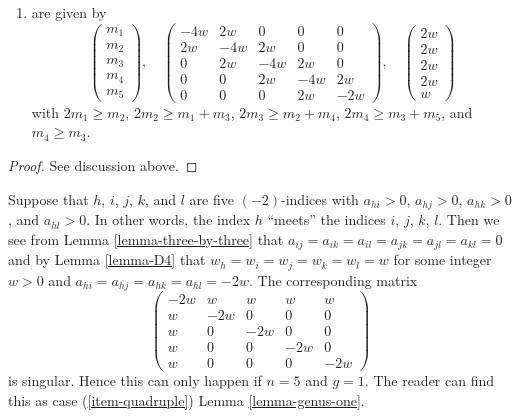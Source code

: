 \begin{lemma}
\begin{enumerate}
$$\begin{matrix}
w \\
w \\
2w
\end{matrix}
\right)
$$
with $2m_1 \geq m_2$, $2m_2 \geq m_1 + m_3$, $2m_3 \geq m_2 + 2m_4$,
$2m_4 \geq m_3 + m_5$, and $2m_5 \geq m_4$, or
\item
\label{item-B5}
are given by
$$
\left(
\begin{matrix}
m_1 \\
m_2 \\
m_3 \\
m_4 \\
m_5
\end{matrix}
\right),
\quad
\left(
\begin{matrix}
-4w & 2w & 0 & 0 & 0 \\
2w & -4w & 2w & 0 & 0 \\
0 & 2w & -4w & 2w & 0 \\
0 & 0 & 2w & -4w & 2w \\
0 & 0 & 0 & 2w & -2w
\end{matrix}
\right),
\quad
\left(
\begin{matrix}
2w \\
2w \\
2w \\
2w \\
w
\end{matrix}
\right)
$$
with $2m_1 \geq m_2$, $2m_2 \geq m_1 + m_3$, $2m_3 \geq m_2 + m_4$,
$2m_4 \geq m_3 + m_5$, and $m_4 \geq m_3$.
\end{enumerate}
\end{lemma}

\begin{proof}
See discussion above.
\end{proof}

\noindent
Suppose that $h$, $i$, $j$, $k$, and $l$ are five $(-2)$-indices
with $a_{hi} > 0$, $a_{hj} > 0$, $a_{hk} > 0$, and $a_{hl} > 0$.
In other words, the index $h$ ``meets'' the indices
$i$, $j$, $k$, $l$. Then we see from Lemma \ref{lemma-three-by-three}
that $a_{ij} = a_{ik} = a_{il} = a_{jk} = a_{jl} = a_{kl} = 0$ and
by Lemma \ref{lemma-D4} that
$w_h = w_i = w_j = w_k = w_l = w$ for some integer $w > 0$ and
$a_{hi} = a_{hj} = a_{hk} = a_{hl} = -2w$.
The corresponding matrix
$$
\left(
\begin{matrix}
-2w & w & w & w & w \\
w & -2w & 0 & 0 & 0 \\
w & 0 & -2w & 0 & 0 \\
w & 0 & 0 & -2w & 0 \\
w & 0 & 0 & 0 & -2w
\end{matrix}
\right)
$$
is singular. Hence this can only happen if $n = 5$ and $g = 1$.
The reader can find this as case
(\ref{item-quadruple}) Lemma \ref{lemma-genus-one}.

